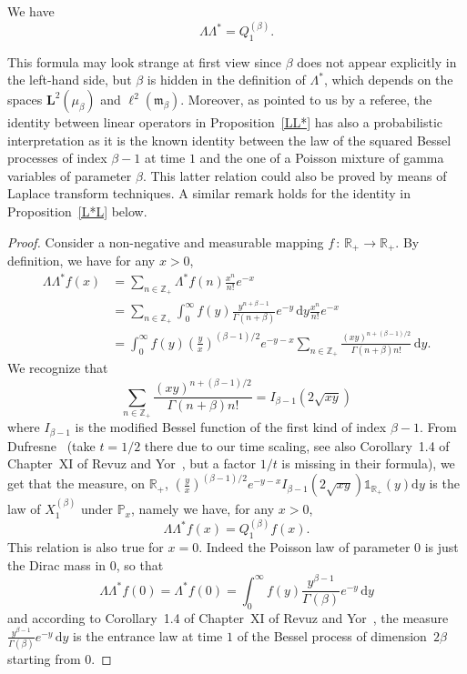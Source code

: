 \documentclass[10pt]{amsart}
\theoremstyle{definition}\newtheorem{defi}[theo]{Definition}\newtheorem{rema}[theo]{Remark}\newtheorem{exam}[theo]{Example}\newtheorem{exem}[theo]{Example}\newtheorem{nota}[theo]{Notation}
\newcommand{\PP}{\mathbb{P}}
\newcommand{\RR}{\mathbb{R}}
\newcommand{\ZZ}{\mathbb{Z}}
\newcommand{\fm}{\mathfrak{m}}
\newcommand{\iy}{\infty}
\newcommand{\lt}{\left}
\newcommand{\ri}{\rightarrow}
\newcommand{\rt}{\right}
\newcommand{\st}{\,:\,}
\newcommand{\un}{\mathds{1}}
\newcommand{\Bs}{Q}
\newcommand{\esL}{\mathbf{L}}
\newcommand{\esLd}{\ell}
\newcommand{\adjL}{\Lambda^*}
\newcommand*{\dd}{\mathrm{d}}
\newcommand*{\dy}{\dd y}
\begin{document}
\begin{prop}\label{LL*}
We have
\[
\Lambda\adjL =\Bs^{(\beta)}_1.
\]
\end{prop}

This formula may look strange at first view since $\beta$ does not appear explicitly in the left-hand side, but $\beta$ is hidden in the definition of $\adjL $, which depends on the spaces $\esL^2(\mu_{\beta})$ and $\esLd^2(\fm_{\beta})$. Moreover, as pointed to us by a referee, the identity between linear operators in Proposition~\ref{LL*} has also a probabilistic interpretation as it is the known identity between the law of the squared Bessel processes of index $\beta-1$ at time $1$ and the one of a Poisson mixture of gamma variables of parameter $\beta$. This latter relation could also be proved by means of Laplace transform techniques. A similar remark holds for the identity in Proposition~\ref{L*L} below.
\begin{proof}
Consider a non-negative and measurable mapping $f\st \RR_+\ri \RR_+$. By definition, we have for any $x>0$,
\begin{align*}
\Lambda\adjL f(x)&=
\sum_{n\in\ZZ_+} \adjL f(n) \frac{x^n}{n!}e^{-x}\\
&=\sum_{n\in\ZZ_+} \int_0^{\iy}f(y)\frac{y^{n+\beta-1}}{\Gamma(n+\beta)}e^{-y}\, \dy \frac{x^n}{n!}e^{-x}
\\
&=
\int_0^{\iy}f(y)\lt(\frac{y}{x}\rt)^{(\beta-1)/2}e^{-y-x}\sum_{n\in\ZZ_+} \frac{(xy)^{n+(\beta-1)/2}}{\Gamma(n+\beta)n!}\, \dy.
\end{align*}
We recognize that
\[
\sum_{n\in\ZZ_+} \frac{(xy)^{n+(\beta-1)/2}}{\Gamma(n+\beta)n!}=I_{\beta-1}(2\sqrt{xy})
\]
where $I_{\beta-1}$ is the modified Bessel function of the first kind of index $\beta-1$. From Dufresne~\cite{MR2181585} (take $t=1/2$ there due to our time scaling, see also Corollary~1.4 of Chapter~XI of Revuz and Yor~\cite{MR1725357}, but a factor $1/t$ is missing in their formula), we get that the measure, on $\RR_+$, $
\lt(\frac{y}{x}\rt)^{(\beta-1)/2}e^{-y-x}I_{\beta-1}(2\sqrt{xy})\un_{\RR_+}(y) \dy$ is the law of $X^{(\beta)}_1$ under $\PP_x$, namely we have, for any $x>0$,
\[
\Lambda\adjL f(x)=\Bs^{(\beta)}_1 f (x).
\]
This relation is also true for $x=0$. Indeed the Poisson law of parameter 0 is just the Dirac mass in 0, so that
\[
\Lambda\adjL f(0)= \adjL f(0)=\int_0^{\iy}f(y)\frac{y^{\beta-1}}{\Gamma(\beta)}e^{-y}\, \dy
\]
and according to Corollary~1.4 of Chapter~XI of Revuz and Yor~\cite{MR1725357}, the measure $\frac{y^{\beta-1}}{\Gamma(\beta)}e^{-y}\, \dy$ is the entrance law at time $1$ of the Bessel process of dimension~$2\beta$ starting from $0$.
\end{proof}
\end{document}
